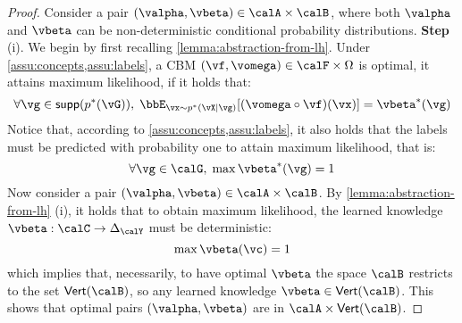 \begin{proof}
    Consider a pair $(\valpha, \vbeta) \in \calA \times \calB$, where both $\valpha$ and $\vbeta$ can be non-deterministic conditional probability distributions. 
    \textbf{Step} (i).
    We begin by first recalling \cref{lemma:abstraction-from-lh}. Under \cref{assu:concepts,assu:labels},
    a CBM $(\vf, \vomega) \in \calF \times \Omega$ is optimal, \ie it attains maximum likelihood, if it holds that: 
    \[
        \forall \vg \in \mathsf{supp}(p^*(\vG)), \;  \bbE_{\vx \sim p^*(\vX \mid \vg)} [(\vomega \circ \vf) (\vx)] = \vbeta^* (\vg)
    \]
    Notice that, according to \cref{assu:concepts,assu:labels}, it also holds that the labels must be predicted with probability one to attain maximum likelihood, that is:
    \[
        \forall \vg \in \calG, \; \max \vbeta^* (\vg) = 1
    \]
    Now consider a pair $(\valpha, \vbeta) \in \calA \times \calB$.
    By \cref{lemma:abstraction-from-lh} (i), it holds that to obtain maximum likelihood, the learned knowledge $\vbeta: \calC \to \Delta_\calY$ must be deterministic:
    \[
        \max \vbeta (\vc) =1
    \]
    which implies that, necessarily, to have optimal $\vbeta$ the space $\calB$ restricts to the set $\Vset{\calB}$, so any learned knowledge $\vbeta \in \Vset{\calB}$. 
    This shows that optimal pairs $(\valpha, \vbeta)$ are in $\calA \times \Vset{\calB}$.
    


\end{proof}
